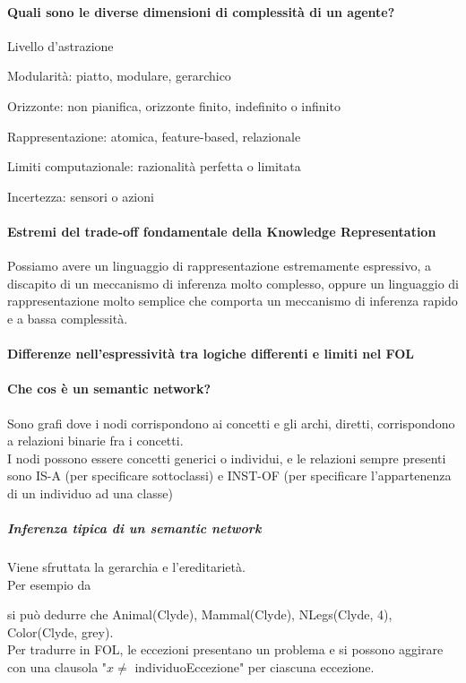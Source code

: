 \documentclass[10pt]{report}
\begin{document}
\paragraph{Quali sono le diverse dimensioni di complessità di un agente?} \begin{list}{}{}
	\item Livello d'astrazione
	\item Modularità: piatto, modulare, gerarchico
	\item Orizzonte: non pianifica, orizzonte finito, indefinito o infinito
	\item Rappresentazione: atomica, feature-based, relazionale
	\item Limiti computazionale: razionalità perfetta o limitata
	\item Incertezza: sensori o azioni
\end{list}
\paragraph{Estremi del trade-off fondamentale della Knowledge Representation} Possiamo avere un linguaggio di rappresentazione estremamente espressivo, a discapito di un meccanismo di inferenza molto complesso, oppure un linguaggio di rappresentazione molto semplice che comporta un meccanismo di inferenza rapido e a bassa complessità.
\paragraph{Differenze nell'espressività tra logiche differenti e limiti nel FOL}
\paragraph{Che cos è un semantic network?} Sono grafi dove i nodi corrispondono ai concetti e gli archi, diretti, corrispondono a relazioni binarie fra i concetti.\\
I nodi possono essere concetti generici o individui, e le relazioni sempre presenti sono IS-A (per specificare sottoclassi) e INST-OF (per specificare l'appartenenza di un individuo ad una classe)
\subparagraph{Inferenza tipica di un semantic network} Viene sfruttata la gerarchia e l'ereditarietà.\\
Per esempio da \begin{center}
\end{center}
si può dedurre che Animal(Clyde), Mammal(Clyde), NLegs(Clyde, 4), Color(Clyde, grey).\\
Per tradurre in FOL, le eccezioni presentano un problema e si possono aggirare con una clausola "$x\neq$ individuoEccezione" per ciascuna eccezione.
\end{document}
